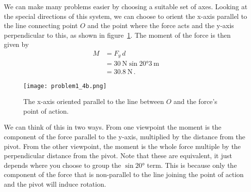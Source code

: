 We can make many problems easier by choosing a suitable set of axes. Looking at the special directions of this system, we can choose to orient the x-axis parallel to the line connecting point $O$ and the point where the force acts and the y-axis perpendicular to this, as shown in figure~\ref{A1:fig:Q4b}. The moment of the force is then given by
\begin{align*}
	M	&=	F_y\, d	\\
		&=	\SI{30}{\N} \sin\ang{20} \SI{3}{\m}\\
		&=	\SI{30.8}{\N} \,.
\end{align*}
\begin{figure}
	\centering
	\texttt{[image: problem1\_4b.png]}
	\caption{The x-axis oriented parallel to the line between $O$ and the force's point of action.}
	\label{A1:fig:Q4b}
\end{figure}
We can think of this in two ways. From one viewpoint the moment is the component of the force parallel to the y-axis, multiplied by the distance from the pivot. From the other viewpoint, the moment is the whole force multiple by the perpendicular distance from the pivot. Note that these are equivalent, it just depends where you choose to group the $\sin\ang{20}$ term. This is because only the component of the force that is non-parallel to the line joining the point of action and the pivot will induce rotation.
\clearpage